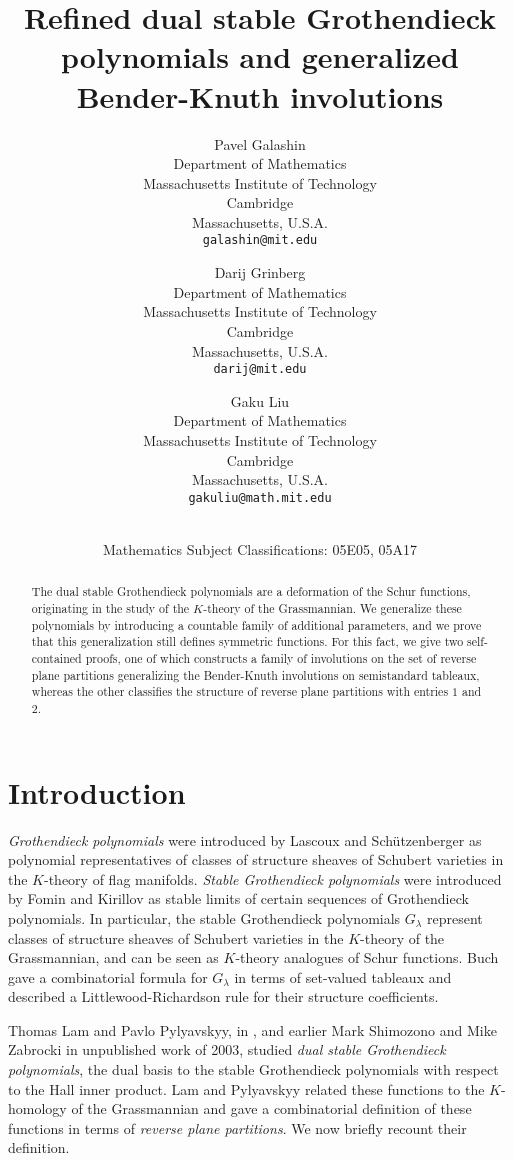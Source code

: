 \documentclass[12pt]{article}
\title{Refined dual stable Grothendieck polynomials and generalized Bender-Knuth involutions}
\author{Pavel Galashin\\
\small Department of Mathematics\\
\small Massachusetts Institute of Technology\\[-0.8ex]
\small Cambridge\\[-0.8ex] 
\small Massachusetts, U.S.A.\\
\small\tt galashin@mit.edu\\
\and
Darij Grinberg\\
\small Department of Mathematics\\
\small Massachusetts Institute of Technology\\[-0.8ex]
\small Cambridge\\[-0.8ex] 
\small Massachusetts, U.S.A.\\
\small\tt darij@mit.edu\\
\and
Gaku Liu\\
\small Department of Mathematics\\
\small Massachusetts Institute of Technology\\[-0.8ex]
\small Cambridge\\[-0.8ex] 
\small Massachusetts, U.S.A.\\
\small\tt gakuliu@math.mit.edu\\
}
\date{\dateline{Jan 1, 2012}{Jan 2, 2012}\\
\small Mathematics Subject Classifications: 05E05, 05A17}
\theoremstyle{plain}
\theoremstyle{definition}
\begin{document}
\maketitle

\begin{abstract}
The dual stable Grothendieck polynomials are a deformation of
the Schur functions, originating in the study of the $K$-theory of the
Grassmannian. We generalize these polynomials by introducing a
countable family of additional parameters, and we prove that this
generalization still defines symmetric functions. For this fact, we
give two self-contained proofs, one of which constructs a family of
involutions on the set of reverse plane partitions generalizing the
Bender-Knuth involutions on semistandard tableaux, whereas the other
classifies the structure of reverse plane partitions with entries $1$
and $2$.
\end{abstract}

\section{Introduction}

\emph{Grothendieck polynomials} were introduced by Lascoux and Sch\"{u}tzenberger \cite{LasSch82} as polynomial representatives of classes of structure sheaves of Schubert varieties in the $K$-theory of flag manifolds. \emph{Stable Grothendieck polynomials} were introduced by Fomin and Kirillov \cite{FomKir96} as stable limits of certain sequences of Grothendieck polynomials. In particular, the stable Grothendieck polynomials $G_\lambda$ represent classes of structure sheaves of Schubert varieties in the $K$-theory of the Grassmannian, and can be seen as $K$-theory analogues of Schur functions. Buch \cite{Buch02} gave a combinatorial formula for $G_\lambda$ in terms of set-valued tableaux and described a Littlewood-Richardson rule for their structure coefficients.

Thomas Lam and Pavlo Pylyavskyy, in \cite[\S 9.1]{LamPyl}, and earlier Mark
Shimozono and Mike Zabrocki in unpublished work of 2003, studied \textit{dual
stable Grothendieck polynomials}, the dual basis to the stable Grothendieck polynomials with respect to the Hall inner product. Lam and Pylyavskyy related these functions to the $K$-homology of the Grassmannian and gave a combinatorial definition of these functions in terms of \emph{reverse plane partitions}. We now briefly recount their definition.
\begin{comment}
 
\footnote{All definitions
that will be made in this introduction are provisional. Every notion that will
be used in the paper is going to be defined in more detail and precision in
one of the sections below; thus, a reader not already familiar with Schur
functions and partitions should start reading from Section
\ref{sect.notations} on.}

\end{comment}
\end{document}
